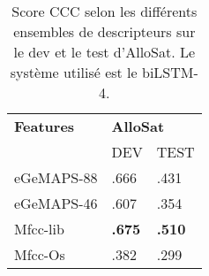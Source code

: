 \begin{table}[ht!]
    \centering
    \begin{tabular}{| l | l | l |}
    \hline
    \textbf{Features} &\multicolumn{2}{l|}{\textbf{AlloSat}} \\
    &DEV &TEST \\
    \hline
    eGeMAPS-88  &.666  &.431\\
    eGeMAPS-46  &.607  &.354\\
    Mfcc-lib    &\textbf{.675}  &\textbf{.510}\\
    Mfcc-Os     &.382  &.299\\
    \hline
\end{tabular}
    \caption{Score CCC selon les différents ensembles de descripteurs sur le dev et le test d'AlloSat. Le système utilisé est le biLSTM-4.}
    \label{tab:egemapsVSmfcc}
\end{table}
